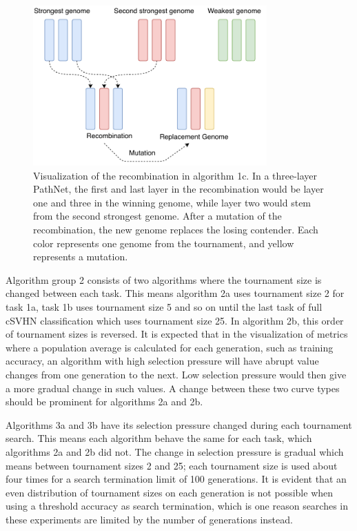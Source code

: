 \begin{figure}[ht]
    \centering
    \includegraphics[width=0.8\textwidth]{Chapters/4.Experiments/exp2/figures/Recombination_algorithm.pdf}
    \caption[Recombination algorithm]{Visualization of the recombination in algorithm 1c. In a three-layer PathNet, the first and last layer in the recombination would be layer one and three in the winning genome, while layer two would stem from the second strongest genome. After a mutation of the recombination, the new genome replaces the losing contender. Each color represents one genome from the tournament, and yellow represents a mutation.}
    \label{fig:search.recombination_algorithm}
\end{figure}

Algorithm group 2 consists of two algorithms where the tournament size is changed between each task. This means algorithm 2a uses tournament size 2 for task 1a, task 1b uses tournament size 5 and so on until the last task of full cSVHN classification which uses tournament size 25. In algorithm 2b, this order of tournament sizes is reversed. It is expected that in the visualization of metrics where a population average is calculated for each generation, such as training accuracy, an algorithm with high selection pressure will have abrupt value changes from one generation to the next. Low selection pressure would then give a more gradual change in such values. A change between these two curve types should be prominent for algorithms 2a and 2b.

Algorithms 3a and 3b have its selection pressure changed during each tournament search. This means each algorithm behave the same for each task, which algorithms 2a and 2b did not. The change in selection pressure is gradual which means between tournament sizes 2 and 25; each tournament size is used about four times for a search termination limit of 100 generations. It is evident that an even distribution of tournament sizes on each generation is not possible when using a threshold accuracy as search termination, which is one reason searches in these experiments are limited by the number of generations instead. 

